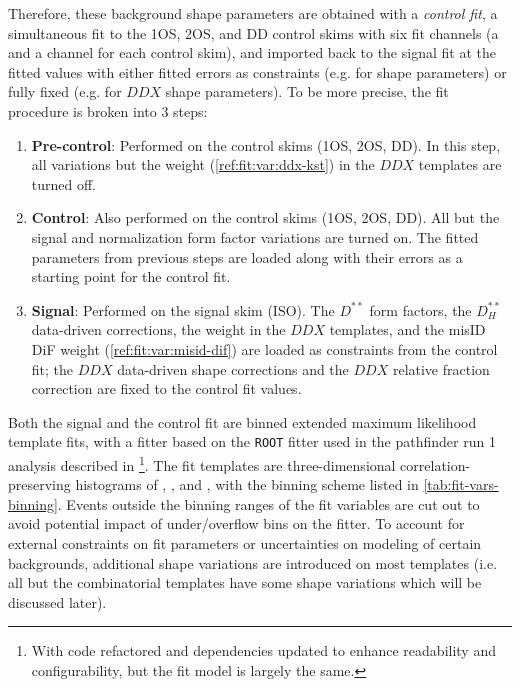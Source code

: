Therefore, these background shape parameters are obtained with a
\emph{control fit},
a simultaneous fit to the 1OS, 2OS, and DD control skims with six fit channels
(a \Dz and a \Dstar channel for each control skim),
and imported back to the signal fit at the fitted values with either
fitted errors as constraints (e.g. for \Dstst shape parameters) or fully fixed
(e.g. for $DDX$ shape parameters).
To be more precise,
the fit procedure is broken into 3 steps:

\begin{enumerate}
    \item \textbf{Pre-control}:
        Performed on the control skims (1OS, 2OS, DD).
        In this step, all variations but the \Kstar weight
        (\cref{ref:fit:var:ddx-kst}) in the $DDX$
        templates are turned off.
    \item \textbf{Control}:
        Also performed on the control skims (1OS, 2OS, DD).
        All but the signal and normalization form factor variations are turned
        on.
        The fitted parameters from previous steps are loaded along with their
        errors as a starting point for the control fit.
    \item \textbf{Signal}:
        Performed on the signal skim (ISO).
        The $D^{**}$ form factors,
        the $D_H^{**}$ data-driven corrections,
        the \Kstar weight in the $DDX$ templates,
        and the misID DiF weight (\cref{ref:fit:var:misid-dif})
        are loaded as constraints from the control fit;
        the $DDX$ data-driven shape corrections and
        the $DDX$ relative fraction correction
        are fixed to the control fit values.
\end{enumerate}

Both the signal and the control fit are binned extended maximum likelihood
template fits,
with a fitter based on the \texttt{ROOT} \HistFactory fitter
used in the pathfinder run 1 \RDX analysis described in
\cite{LHCb-ANA-2020-056}\footnote{
    With code refactored and dependencies updated to enhance readability and
    configurability,
    but the fit model is largely the same.
}.
The fit templates are three-dimensional correlation-preserving
histograms of \mmSq, \el, and \qSq,
with the binning scheme listed in \cref{tab:fit-vars-binning}.
Events outside the binning ranges of the fit variables are cut out to avoid
potential impact of under/overflow bins on the fitter.
To account for external constraints on fit parameters or uncertainties on
modeling of certain backgrounds,
additional shape variations are introduced on most templates
(i.e. all but the \Dstar combinatorial templates have some shape variations
which will be discussed later).

